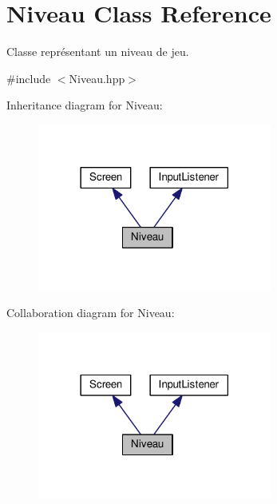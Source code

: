 \hypertarget{class_niveau}{}\section{Niveau Class Reference}
\label{class_niveau}


Classe représentant un niveau de jeu.  




{\ttfamily \#include $<$Niveau.\+hpp$>$}



Inheritance diagram for Niveau\+:\nopagebreak
\begin{figure}[H]
\begin{center}
\leavevmode
\includegraphics[width=218pt]{class_niveau__inherit__graph}
\end{center}
\end{figure}


Collaboration diagram for Niveau\+:\nopagebreak
\begin{figure}[H]
\begin{center}
\leavevmode
\includegraphics[width=218pt]{class_niveau__coll__graph}
\end{center}
\end{figure}

